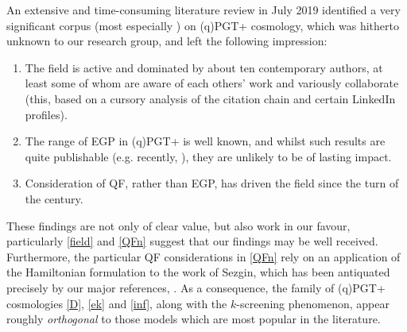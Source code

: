 \documentclass[twoside]{report}
\begin{document}
\begin{multicols}{2}
An extensive and time-consuming literature review in July 2019 identified a very significant corpus (most especially \cite{1980PhLA...80..232M,1984CQGra...1..651G,2000CQGra..17.3045M,2003gr.qc....10060M,2007AcPPB..38...61M,2006CQGra..23.4237M,2007CQGra..24.5835M,2009PhLB..678..423M,2011arXiv1107.1566G,2013JCAP...03..040M,2005NewAR..49...59P,2008PhRvD..78b3522S,2009JCAP...10..027C}) on (q)PGT+ cosmology, which was hitherto unknown to our research group, and left the following impression:
\begin{enumerate}[resume]
  \item\label{field} The field is active and dominated by about ten contemporary authors, at least some of whom are aware of each others' work and variously collaborate (this, based on a cursory analysis of the citation chain and certain LinkedIn profiles).
  \item\label{boring} The range of EGP in (q)PGT+ is well known, and whilst such results are quite publishable (e.g. recently, \cite{2019arXiv190604340Z}), they are unlikely to be of lasting impact.
  \item\label{QFn} Consideration of QF, rather than EGP, has driven the field since the turn of the century.
\end{enumerate}
These findings are not only of clear value, but also work in our favour, particularly \ref{field} and \ref{QFn} suggest that our findings may be well received. Furthermore, the particular QF considerations in \ref{QFn} rely \cite{2011PhRvD..83b4001B} on an application of the Hamiltonian formulation to the work of Sezgin, which has been antiquated precisely by our major references, \cite{2019PhRvD..99f4001L,Lin2}. As a consequence, the family of (q)PGT+ cosmologies \ref{D}, \ref{ek} and \ref{inf}, along with the $k$-screening phenomenon, appear roughly \textit{orthogonal} to those models which are most popular in the literature.


\end{multicols}
\end{document}
